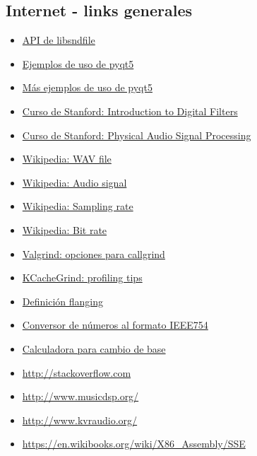 \documentclass[a4paper,spanish,12pt]{article}
\begin{document}
\subsection{Internet - links generales}
\begin{itemize}
\item \href{http://www.mega-nerd.com/libsndfile/api.html}{API de libsndfile}
\item \href{http://zetcode.com/gui/pyqt5/}{Ejemplos de uso de pyqt5}
\item \href{https://github.com/shuge/Qt-Python-Binding-Examples}{Más ejemplos de uso de pyqt5}
\item \href{https://ccrma.stanford.edu/~jos/}{Curso de Stanford: Introduction to Digital Filters}
\item \href{https://ccrma.stanford.edu/~jos/pasp/}{Curso de Stanford: Physical Audio Signal Processing}
\item \href{https://en.wikipedia.org/wiki/WAV}{Wikipedia: WAV file}
\item \href{https://en.wikipedia.org/wiki/Audio_signal}{Wikipedia: Audio signal}
\item \href{http://en.wikipedia.org/wiki/Sampling_rate}{Wikipedia: Sampling rate}
\item \href{https://en.wikipedia.org/wiki/Bit_rate}{Wikipedia: Bit rate}
\item \href{http://valgrind.org/docs/manual/cl-manual.html}{Valgrind: opciones para callgrind}
\item \href{http://kcachegrind.sourceforge.net/html/Tips.html}{KCacheGrind: profiling tips}
\item \href{http://whatis.techtarget.com/definition/flanging}{Definición flanging}
\item \href{http://www.h-schmidt.net/FloatConverter/IEEE754.html}{Conversor de números al formato IEEE754}
\item \href{http://www.cleavebooks.co.uk/scol/calnumba.htm}{Calculadora para cambio de base}
\item \url{http://stackoverflow.com}
\item \url{http://www.musicdsp.org/}
\item \url{http://www.kvraudio.org/}
\item \url{https://en.wikibooks.org/wiki/X86_Assembly/SSE}
\end{itemize}
\end{document}
